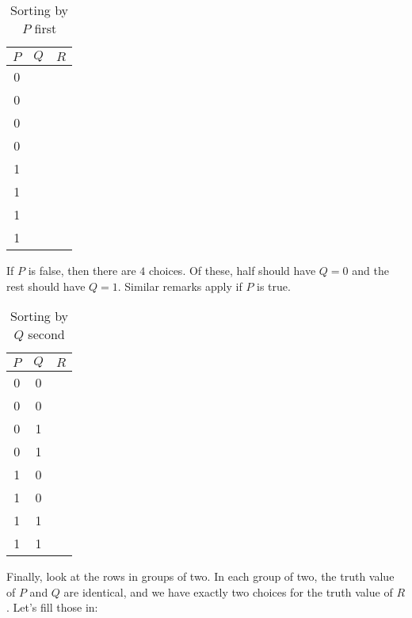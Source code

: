 \begin{table}[h!]
	\begin{center}
		\caption{Sorting by $P$ first}
		\begin{tabular}{c|c|c} 
			$P$ & $Q$ & $R$ \\
			\hline
			0 &  &  \\  \hline
			0 &  &  \\  \hline
			0 &  &  \\  \hline
			0 &  &  \\  \hline
			1 &  &  \\  \hline
			1 &  &  \\  \hline
			1 &  &  \\  \hline
			1 &  &  \\  \hline
		\end{tabular}
	\end{center}
\end{table}

If $P$ is false, then there are $4$ choices.  Of these, half should have $Q = 0$ and the rest should have $Q = 1$.  Similar remarks apply if $P$ is true.


\begin{table}[h!]
	\begin{center}
		\caption{Sorting by $Q$ second}
		\begin{tabular}{c|c|c} 
			$P$ & $Q$ & $R$ \\
			\hline
			0 & 0 &  \\  \hline
			0 & 0 &  \\  \hline
			0 & 1 &  \\  \hline
			0 & 1 &  \\  \hline
			1 & 0 &  \\  \hline
			1 & 0 &  \\  \hline
			1 & 1 &  \\  \hline
			1 & 1  &  \\  \hline
		\end{tabular}
	\end{center}
\end{table}

Finally, look at the rows in groups of two.  In each group of two, the truth value of $P$ and $Q$ are identical, and we have exactly two choices for the truth value of $R$.  Let's fill those in:


